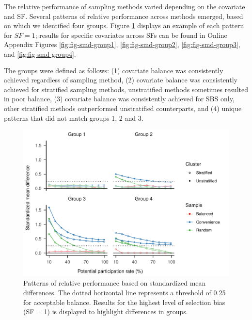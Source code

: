 \documentclass[
  man,floatsintext]{apa6}
\begin{document}
The relative performance of sampling methods varied depending on the covariate and SF. Several patterns of relative performance across methods emerged, based on which we identified four groups. Figure \ref{fig:fig-SMD-groups} displays an example of each pattern for \(SF = 1\); results for specific covariates across SFs can be found in Online Appendix Figures \ref{fig:fig-smd-group1}, \ref{fig:fig-smd-group2}, \ref{fig:fig-smd-group3}, and \ref{fig:fig-smd-group4}.

The groups were defined as follows:
(1) covariate balance was consistently achieved regardless of sampling method,
(2) covariate balance was consistently achieved for stratified sampling methods, unstratified methods sometimes resulted in poor balance,
(3) covariate balance was consistently achieved for SBS only, other stratified methods outperformed unstratified counterparts,
and (4) unique patterns that did not match groups 1, 2 and 3.



\begin{figure}
\centering
\includegraphics{6---Paper_files/figure-latex/fig-SMD-groups-1.pdf}
\caption{\label{fig:fig-SMD-groups}Patterns of relative performance based on standardized mean differences. The dotted horizontal line represents a threshold of 0.25 for acceptable balance. Results for the highest level of selection bias (SF = 1) is displayed to highlight differences in groups.}
\end{figure}
\end{document}
